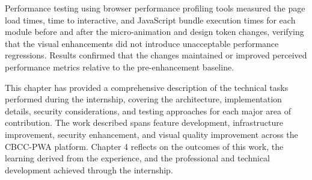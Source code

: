 Performance testing using browser performance profiling tools measured the page load times, time to interactive, and JavaScript bundle execution times for each module before and after the micro-animation and design token changes, verifying that the visual enhancements did not introduce unacceptable performance regressions. Results confirmed that the changes maintained or improved perceived performance metrics relative to the pre-enhancement baseline.

This chapter has provided a comprehensive description of the technical tasks performed during the internship, covering the architecture, implementation details, security considerations, and testing approaches for each major area of contribution. The work described spans feature development, infrastructure improvement, security enhancement, and visual quality improvement across the CBCC-PWA platform. Chapter 4 reflects on the outcomes of this work, the learning derived from the experience, and the professional and technical development achieved through the internship.
